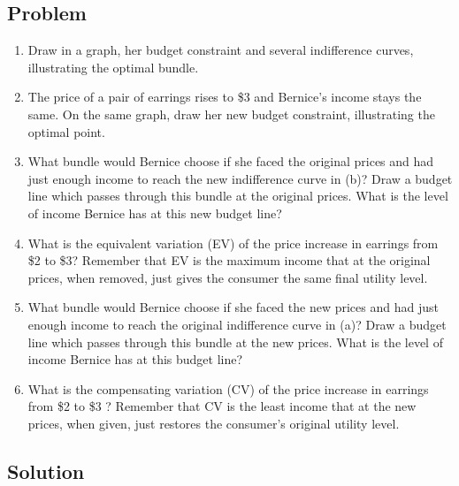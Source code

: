 \documentclass[12pt]{article}
\begin{document}
\subsection{Problem}
\begin{enumerate}[label=(\alph*)]
    \item Draw in a graph, her budget constraint and several indifference curves, illustrating the optimal bundle.
    \item The price of a pair of earrings rises to \$3 and Bernice’s income stays the same. On the same graph, draw her new budget constraint, illustrating the optimal point.
    \item What bundle would Bernice choose if she faced the original prices and had just enough income to reach the new indifference curve in (b)? Draw a budget line which passes through this bundle at the original prices. What is the level of income Bernice has at this new budget line?
    \item What is the equivalent variation (EV) of the price increase in earrings from \$2 to \$3? Remember that EV is the maximum income that at the original prices, when removed, just gives the consumer the same final utility level.
    \item What bundle would Bernice choose if she faced the new prices and had just enough income to reach the original indifference curve in (a)? Draw a budget line which passes through this bundle at the new prices. What is the level of income Bernice has at this budget line?
    \item What is the compensating variation (CV) of the price increase in earrings from \$2 to \$3 ? Remember that CV is the least income that at the new prices, when given, just restores the consumer’s original utility level.
\end{enumerate}

\newpage
\subsection{Solution}
\end{document}
